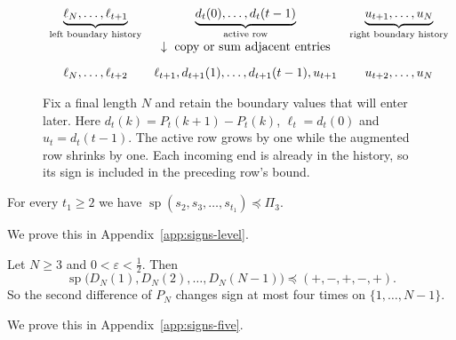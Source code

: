 \begin{figure}[ht]
\centering
\small
\[
\begin{array}{c@{\quad}c@{\quad}c}
\underbrace{\ell_N,\ldots,\ell_{t+1}}_{\text{left boundary history}}&
\underbrace{d_t(0),\ldots,d_t(t-1)}_{\text{active row}}&
\underbrace{u_{t+1},\ldots,u_N}_{\text{right boundary history}}\\[9pt]
&\downarrow\ \text{copy or sum adjacent entries}&\\[9pt]
\ell_N,\ldots,\ell_{t+2}&
\ell_{t+1},d_{t+1}(1),\ldots,d_{t+1}(t-1),u_{t+1}&
u_{t+2},\ldots,u_N
\end{array}
\]
\caption{Fix a final length $N$ and retain the boundary values
that will enter later. Here $d_t(k)=P_t(k+1)-P_t(k)$,
$\ell_t=d_t(0)$ and $u_t=d_t(t-1)$.
The active row grows by one while the augmented row shrinks by one.
Each incoming end is already in the history, so its sign is
included in the preceding row's bound.}
\label{fig:augmented-rows}
\end{figure}

\begin{lemma}\label{lem:level-one}
For every $t_1\ge2$ we have $\operatorname{sp}(s_2,s_3,\dots,s_{t_1})\preceq\Pi_3$.
\end{lemma}

We prove this in Appendix~\ref{app:signs-level}.

\begin{theorem}\label{thm:five-blocks}
Let $N\ge3$ and $0<\varepsilon<\frac12$. Then
\[
 \operatorname{sp}\bigl(D_N(1),D_N(2),\dots,D_N(N-1)\bigr)\preceq(+,-,+,-,+).
\]
So the second difference of $P_N$ changes sign at most four times on
$\{1,\dots,N-1\}$.
\end{theorem}

We prove this in Appendix~\ref{app:signs-five}.
